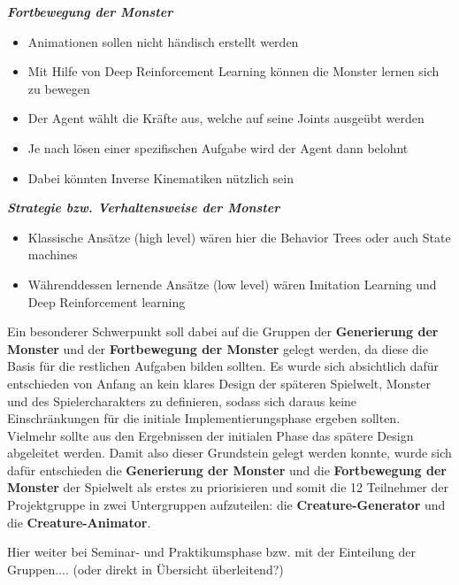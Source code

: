 \textbf{\textit{Fortbewegung der Monster}}
\begin{itemize}
	\item Animationen sollen nicht händisch erstellt werden
	\item Mit Hilfe von Deep Reinforcement Learning können die Monster lernen sich zu bewegen
	\item Der Agent wählt die Kräfte aus, welche auf seine Joints ausgeübt werden
	\item Je nach lösen einer spezifischen Aufgabe wird der Agent dann belohnt
	\item Dabei könnten Inverse Kinematiken nützlich sein
\end{itemize}
\textbf{\textit{Strategie bzw. Verhaltensweise der Monster}}
\begin{itemize}
	\item Klassische Ansätze (high level) wären hier die Behavior Trees oder auch State machines
	\item Währenddessen lernende Ansätze (low level) wären Imitation Learning und Deep Reinforcement learning
\end{itemize}

Ein besonderer Schwerpunkt soll dabei auf die Gruppen der \textbf{Generierung der Monster} und der \textbf{Fortbewegung der Monster} gelegt werden, da diese die Basis für die restlichen Aufgaben bilden sollten. Es wurde sich absichtlich dafür entschieden von Anfang an kein klares Design der späteren Spielwelt, Monster und des Spielercharakters zu definieren, sodass sich daraus keine Einschränkungen für die initiale Implementierungsphase ergeben sollten. Vielmehr sollte aus den Ergebnissen der initialen Phase das spätere Design abgeleitet werden. Damit also dieser Grundstein gelegt werden konnte, wurde sich dafür entschieden die \textbf{Generierung der Monster} und die \textbf{Fortbewegung der Monster} der Spielwelt als erstes zu priorisieren und somit die 12 Teilnehmer der Projektgruppe in zwei Untergruppen aufzuteilen: die \textbf{Creature-Generator} und die \textbf{Creature-Animator}.

Hier weiter bei Seminar- und Praktikumsphase bzw. mit der Einteilung der Gruppen.... (oder direkt in Übersicht überleitend?)

